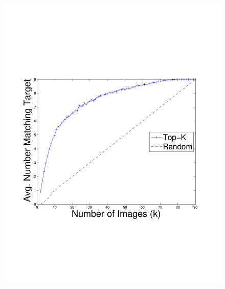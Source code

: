 \begin{figure}[t!]
{        \includegraphics[clip=true, trim = 17mm 65mm 25mm 70mm, scale=0.23]{figures/topk/avg_num_matching_color.pdf}
        \label{fig:topkAvgNumSameSet}
        }
\end{figure}
